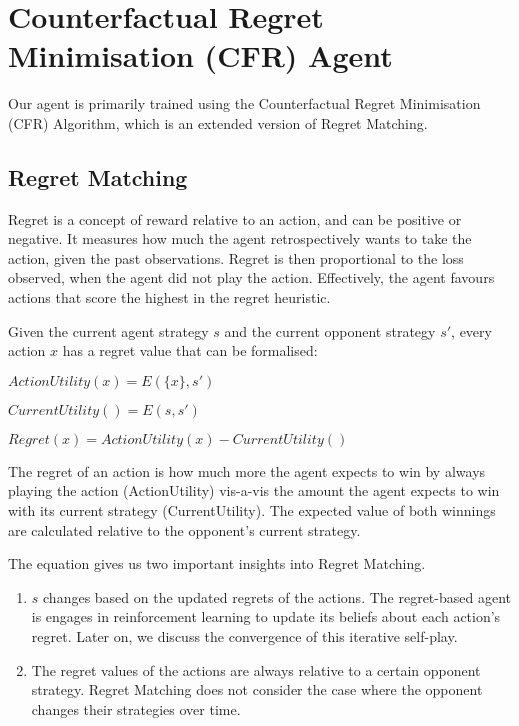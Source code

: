 \documentclass{article}
\begin{document}
\section{Counterfactual Regret Minimisation (CFR) Agent}

Our agent is primarily trained using the Counterfactual Regret Minimisation (CFR) Algorithm, which is an extended version of Regret Matching.

\subsection{Regret Matching}

Regret is a concept of reward relative to an action, and can be positive or negative. It measures how much the agent retrospectively wants to take the action, given the past observations. Regret is then proportional to the loss observed, when the agent did not play the action. Effectively, the agent favours actions that score the highest in the regret heuristic. 

Given the current agent strategy $s$ and the current opponent strategy $s'$, every action $x$ has a regret value that can be formalised:

\begin{center}
$ActionUtility(x) = E(\{x\}, s')$

$CurrentUtility() = E(s, s')$

$Regret(x) = ActionUtility(x) - CurrentUtility()$
\end{center}

The regret of an action is how much more the agent expects to win by always playing the action (ActionUtility) vis-a-vis the amount the agent expects to win with its current strategy (CurrentUtility). The expected value of both winnings are calculated relative to the opponent's current strategy.

The equation gives us two important insights into Regret Matching.

\begin{enumerate}
	\item $s$ changes based on the updated regrets of the actions. The regret-based agent is engages in reinforcement learning to update its beliefs about each action's regret. Later on, we discuss the convergence of this iterative self-play.
	\item The regret values of the actions are always relative to a certain opponent strategy. Regret Matching does not consider the case where the opponent changes their strategies over time.
\end{enumerate}
\end{document}
